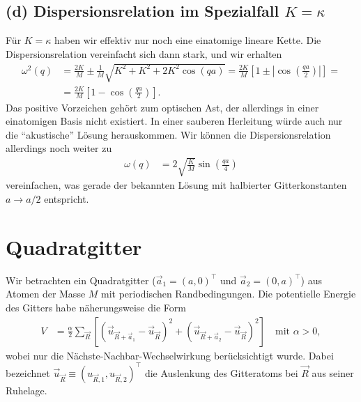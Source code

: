 \documentclass[english, parskip=full]{scrartcl}
\newcommand{\kla}{}
\newcommand{\klam}{}
\newcommand{\tecxt}{}
\begin{document}
\newpage
\subsection*{(d) Dispersionsrelation im Spezialfall $K=\kappa$}
Für $K=\kappa$ haben wir effektiv nur noch eine einatomige lineare Kette.
Die Dispersionsrelation vereinfacht sich dann stark, und wir erhalten
\begin{align}
\omega^2(q) &= \frac{2K}{M} \pm \frac{1}{M}\sqrt{K^2 + K^2 + 2K^2\cos(qa)} = \frac{2K}{M}\klam\left[ 1 \pm \left\vert \cos\kla\left( \frac{qa}{2} \right)\right\vert \right] = \\
&= \frac{2K}{M}\klam\left[ 1 - \cos \kla\left( \frac{qa}{2} \right) \right].
\end{align}
Das positive Vorzeichen gehört zum optischen Ast, der allerdings in einer einatomigen Basis nicht existiert.
In einer sauberen Herleitung würde auch nur die ``akustische'' Lösung herauskommen.
Wir können die Dispersionsrelation allerdings noch weiter zu
\begin{align}
\omega(q) &= 2\sqrt{\frac{K}{M}}\sin\kla\left( \frac{qa}{4} \right)
\end{align}
vereinfachen, was gerade der bekannten Lösung mit halbierter Gitterkonstanten $a\rightarrow a/2$ entspricht.

\section{Quadratgitter}
Wir betrachten ein Quadratgitter ($\vec{a}_1 = (a,0)^\top$ und $\vec{a}_2 = (0,a)^\top$) aus Atomen der Masse $M$ mit periodischen Randbedingungen.
Die potentielle Energie des Gitters habe näherungsweise die Form
\begin{align}
V &= \frac{\alpha}{2}\sum_{\vec{R}}\klam\left[ \kla\left( \vec{u}_{\vec{R} + \vec{a}_1} - \vec{u}_{\vec{R}} \right)^2 + \kla\left( \vec{u}_{\vec{R} + \vec{a}_2} - \vec{u}_{\vec{R}} \right)^2 \right] \quad \tecxt\text{mit } \alpha > 0,
\end{align}
wobei nur die Nächste-Nachbar-Wechselwirkung berücksichtigt wurde.
Dabei bezeichnet $\vec{u}_{\vec{R}} \equiv (u_{\vec{R}, 1}, u_{\vec{R} , 2})^\top$ die Auslenkung des Gitteratoms bei $\vec{R}$ aus seiner Ruhelage.
\end{document}
